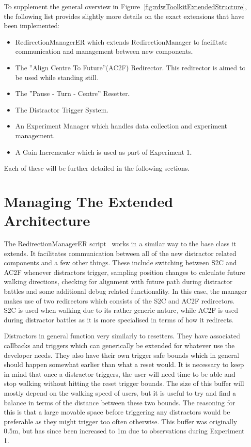 To supplement the general overview in Figure~\ref{fig:rdwToolkitExtendedStructure}, the following list provides slightly more details on the exact extensions that have been implemented:
\begin{itemize}
    \item RedirectionManagerER which extends RedirectionManager to facilitate communication and management between new components.
    \item The ''Align Centre To Future''(AC2F) Redirector. This redirector is aimed to be used while standing still.
    \item The ''Pause - Turn - Centre'' Resetter.
    \item The Distractor Trigger System.
    \item An Experiment Manager which handles data collection and experiment management.
    \item A Gain Incrementer which is used as part of Experiment 1.
\end{itemize}

Each of these will be further detailed in the following sections. 

\section{Managing The Extended Architecture}
The RedirectionManagerER script~\cite{redirectionManagerER} works in a similar way to the base class it extends. It facilitates communication between all of the new distractor related components and a few other things. These include switching between S2C and AC2F whenever distractors trigger, sampling position changes to calculate future walking directions, checking for alignment with future path during distractor battles and some additional debug related functionality. In this case, the manager makes use of two redirectors which consists of the S2C and AC2F redirectors. S2C is used when walking due to its rather generic nature, while AC2F is used during distractor battles as it is more specialised in terms of how it redirects.

Distractors in general function very similarly to resetters. They have associated callbacks and triggers which can generically be extended for whatever use the developer needs. They also have their own trigger safe bounds which in general should happen somewhat earlier than what a reset would. It is necessary to keep in mind that once a distractor triggers, the user will need time to be able and stop walking without hitting the reset trigger bounds. The size of this buffer will mostly depend on the walking speed of users, but it is useful to try and find a balance in terms of the distance between these two bounds. The reasoning for this is that a large movable space before triggering any distractors would be preferable as they might trigger too often otherwise. This buffer was originally 0.5m, but has since been increased to 1m due to observations during Experiment 1.

